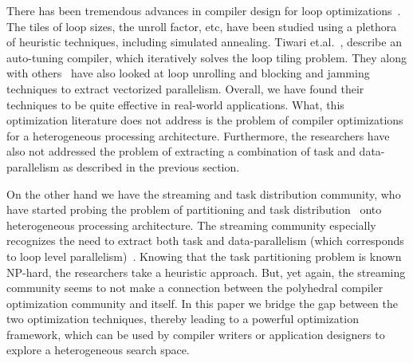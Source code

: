 \documentclass[10pt, conference, compsocconf]{IEEEtran}
\begin{document}
There has been tremendous advances in compiler design for loop
optimizations~\cite{ubon08,atiw09,tkis00}. The tiles of loop sizes, the
unroll factor, etc, have been studied using a plethora of heuristic
techniques, including simulated annealing. Tiwari et.al.~\cite{atiw09},
describe an auto-tuning compiler, which iteratively solves the loop
tiling problem. They along with others~\cite{tkis00} have also looked at
loop unrolling and blocking and jamming techniques to extract vectorized
parallelism. Overall, we have found their techniques to be quite
effective in real-world applications. What, this optimization literature
does not address is the problem of compiler optimizations for a
heterogeneous processing architecture. Furthermore, the researchers have
also not addressed the problem of extracting a combination of task and
data-parallelism as described in the previous section. 

On the other hand we have the streaming and task distribution community,
who have started probing the problem of partitioning and task
distribution~\cite{ssan05,adou04,pcar09} onto heterogeneous processing
architecture. The streaming community especially recognizes the need to
extract both task and data-parallelism (which corresponds to loop level
parallelism)~\cite{mgor06}. Knowing that the task partitioning problem
is known NP-hard, the researchers take a heuristic approach.  But, yet
again, the streaming community seems to not make a connection between
the polyhedral compiler optimization community and itself. In this paper
we bridge the gap between the two optimization techniques, thereby
leading to a powerful optimization framework, which can be used by
compiler writers or application designers to explore a heterogeneous
search space.

\end{document}
